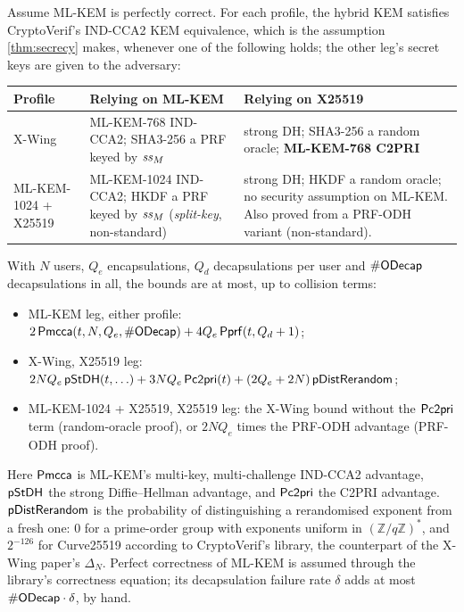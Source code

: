 \begin{lemma}\label{lem:kem}
Assume ML-KEM is perfectly correct. For each profile, the hybrid KEM
satisfies CryptoVerif's IND-CCA2 KEM equivalence, which is the assumption
\cref{thm:secrecy} makes, whenever one of the following holds; the other
leg's secret keys are given to the adversary:
\begin{center}
\small\upshape
\begin{tabularx}{\linewidth}{@{}lLL@{}}
\toprule
Profile & Relying on ML-KEM & Relying on X25519\\
\midrule
X-Wing & ML-KEM-768 IND-CCA2; SHA3-256 a PRF keyed by $\mathit{ss}_M$
       & strong DH; SHA3-256 a random oracle; \textbf{ML-KEM-768 C2PRI}\\
ML-KEM-1024 + X25519 & ML-KEM-1024 IND-CCA2; HKDF a PRF keyed by $\mathit{ss}_M$
       (\emph{split-key}, non-standard)
       & strong DH; HKDF a random oracle; no security assumption on ML-KEM.
       Also proved from a PRF-ODH variant (non-standard).\\
\bottomrule
\end{tabularx}
\end{center}
With $N$ users, $Q_e$ encapsulations, $Q_d$ decapsulations per user and
$\#\mathsf{ODecap}$ decapsulations in all, the bounds are at most, up to
collision terms:
\begin{itemize}
  \item ML-KEM leg, either profile:
  $2\,\mathsf{Pmcca}(t, N, Q_e, \#\mathsf{ODecap}) + 4 Q_e\,\mathsf{Pprf}(t, Q_d + 1)$;
  \item X-Wing, X25519 leg:
  $2 N Q_e\,\mathsf{pStDH}(t, \ldots) + 3 N Q_e\,\mathsf{Pc2pri}(t) + (2Q_e + 2N)\,\mathsf{pDistRerandom}$;
  \item ML-KEM-1024 + X25519, X25519 leg: the X-Wing bound without the
  $\mathsf{Pc2pri}$ term (random-oracle proof), or $2 N Q_e$ times the PRF-ODH
  advantage (PRF-ODH proof).
\end{itemize}
Here $\mathsf{Pmcca}$ is ML-KEM's multi-key, multi-challenge IND-CCA2
advantage, $\mathsf{pStDH}$ the strong Diffie--Hellman advantage, and
$\mathsf{Pc2pri}$ the C2PRI advantage. $\mathsf{pDistRerandom}$ is the probability
of distinguishing a rerandomised exponent from a fresh one: 0 for a
prime-order group with exponents uniform in $(\mathbb{Z}/q\mathbb{Z})^*$,
and $2^{-126}$ for Curve25519
according to CryptoVerif's library, the counterpart of the X-Wing paper's
$\Delta_N$. Perfect correctness of ML-KEM is assumed through the library's
correctness equation; its decapsulation failure rate $\delta$ adds at most
$\#\mathsf{ODecap} \cdot \delta$, by hand.
\end{lemma}

